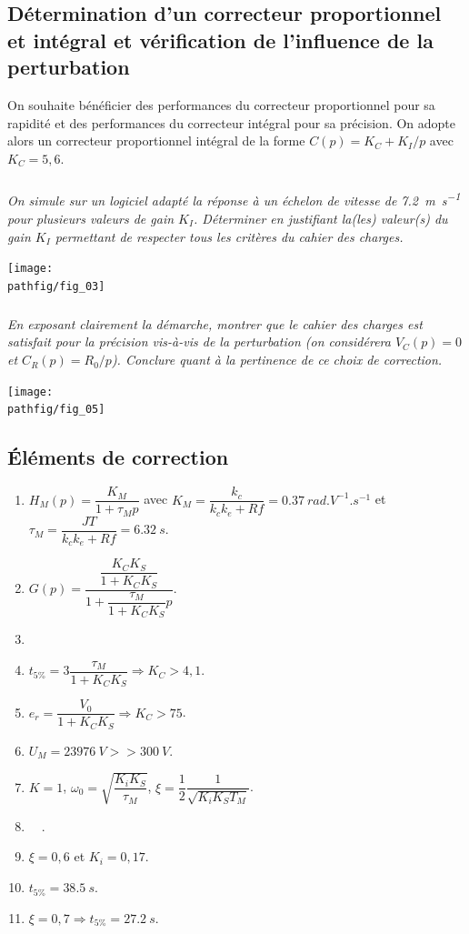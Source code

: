 \documentclass[10pt,fleqn]{article} %
\begin{document}
\subsection*{Détermination d’un correcteur proportionnel et intégral et vérification de l’influence de la perturbation }

On souhaite bénéficier des performances du correcteur proportionnel pour sa rapidité et des performances du correcteur intégral pour sa précision.  On adopte alors un correcteur proportionnel intégral de la forme $C(p)=K_C + K_I/p$ avec $K_C = 5,6$.
 
\subparagraph{}\textit{On simule sur un logiciel adapté la réponse à un échelon de vitesse de \SI{7,2}{m.s^{-1}} pour plusieurs valeurs de gain $K_I$. Déterminer en justifiant la(les) valeur(s) du gain $K_I$ permettant de respecter tous les critères du cahier des charges. }


\begin{center}
\texttt{[image: \\pathfig/fig\_03]}
\end{center}

\subparagraph{}\textit{En exposant clairement la démarche, montrer que le cahier des charges est satisfait pour la précision vis-à-vis de la perturbation (on considérera $V_C (p) = 0$  et $C_R (p)=R_0/p$). Conclure quant à la pertinence de ce choix de correction. }


\begin{center}
\texttt{[image: \\pathfig/fig\_05]}
\end{center}

\newpage 

\subsection*{Éléments de correction}
\begin{multicols}{2}
\begin{enumerate}
\item $H_M(p)=\dfrac{K_M}{1+\tau_M p}$ avec $K_M=\dfrac{k_c}{k_ck_e+Rf}=\SI{0,37}{rad.V^{-1}.s^{-1}}$ et $\tau_M=\dfrac{JT}{k_ck_e+Rf}=\SI{6,32}{s}$.
\item $G(p)=\dfrac{\dfrac{K_CK_S}{1+K_CK_S}}{1+\dfrac{\tau_M}{1+K_CK_S}p}$.
\item $\quad$
\item $t_{5\%}=3\dfrac{\tau_M}{1+K_CK_S} \Rightarrow K_C>4,1$.
\item $e_r=\dfrac{V_0}{1+K_CK_S} \Rightarrow K_C>75$.
\item $U_M=\SI{23976}{V} >> \SI{300}{V}$.
\item $K=1$, $\omega_0=\sqrt{\dfrac{K_iK_S}{\tau_M}}$, $\xi=\dfrac{1}{2}\dfrac{1}{\sqrt{K_iK_ST_M}}$.
\item $\quad$.
\item $\xi=0,6$ et $K_i=0,17$.
\item $t_{5\%}=\SI{38,5}{s}$.
\item $\xi=0,7\Rightarrow t_{5\%}=\SI{27,2}{s}$.
\end{enumerate}
\end{multicols}
\end{document}
